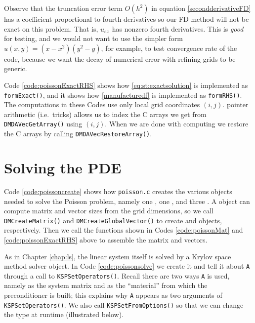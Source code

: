 Observe that the truncation error term $O(h^2)$ in equation \eqref{secondderivativeFD} has a coefficient proportional to fourth derivatives \citep{MortonMayers2005} so our FD method will not be exact on this problem.  That is, $u_{ex}$ has nonzero fourth derivatives.  This is \emph{good} for testing, and we would not want to use the simpler form $u(x,y)=(x-x^2)(y^2-y)$, for example, to test convergence rate of the code, because we want the decay of numerical error with refining grids to be generic.

Code \ref{code:poissonExactRHS} shows how \eqref{eq:st:exactsolution} is implemented as \texttt{formExact()}, and it shows how \eqref{manufacturedf} is implemented as \texttt{formRHS()}.  The computations in these Codes use only local grid coordinates $(i,j)$.  \PETSc pointer arithmetic (i.e.~tricks) allows us to index the C arrays we get from \texttt{DMDAVecGetArray()} using $(i,j)$.  When we are done with computing \pVecs we restore the C arrays by calling \texttt{DMDAVecRestoreArray()}.



\section{Solving the PDE}

Code \ref{code:poissoncreate} shows how \texttt{poisson.c} creates the various objects needed to solve the Poisson problem, namely one \pDM, one \pMat, and three \pVecs.  A \pDM object can compute matrix and vector sizes from the grid dimensions, so we call \texttt{DMCreateMatrix()} and \texttt{DMCreateGlobalVector()} to create \pMat and \pVec objects, respectively.  Then we call the functions shown in Codes \ref{code:poissonMat} and \ref{code:poissonExactRHS} above to assemble the matrix and vectors.


As in Chapter \ref{chap:ls}, the linear system itself is solved by a \pKSP Krylov space method solver object.  In Code \ref{code:poissonsolve} we create it and tell it about \pMat \texttt{A} through a call to \texttt{KSPSetOperators()}.  Recall there are two ways \texttt{A} is used, namely as the system matrix and as the ``material'' from which the preconditioner is built; this explains why \texttt{A} appears as two arguments of \texttt{KSPSetOperators()}.  We also call \texttt{KSPSetFromOptions()} so that we can change the \pKSP type at runtime (illustrated below).

